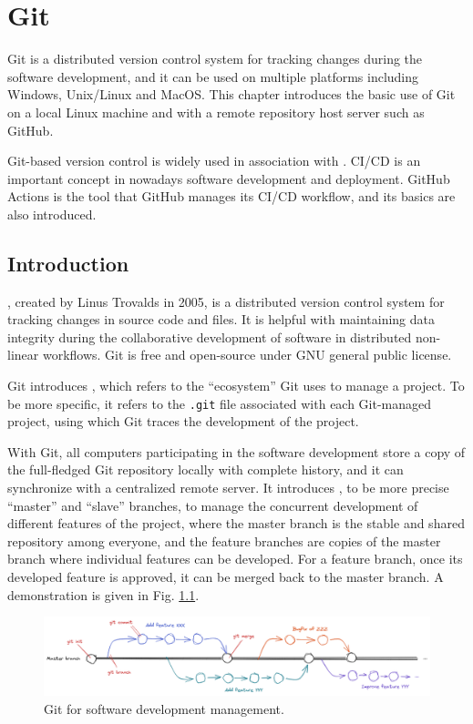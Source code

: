\chapter{Git} \label{ch:git}

Git is a distributed version control system for tracking changes during the software development, and it can be used on multiple platforms including Windows, Unix/Linux and MacOS. This chapter introduces the basic use of Git on a local Linux machine and with a remote repository host server such as GitHub. 

Git-based version control is widely used in association with . CI/CD is an important concept in nowadays software development and deployment. GitHub Actions is the tool that GitHub manages its CI/CD workflow, and its basics are also introduced.

\section{Introduction}

, created by Linus Trovalds in 2005, is a distributed version control system for tracking changes in source code and files. It is helpful with maintaining data integrity during the collaborative development of software in distributed non-linear workflows. Git is free and open-source under GNU general public license.

Git introduces , which refers to the ``ecosystem'' Git uses to manage a project. To be more specific, it refers to the \verb|.git| file associated with each Git-managed project, using which Git traces the development of the project. 

With Git, all computers participating in the software development store a copy of the full-fledged Git repository locally with complete history, and it can synchronize with a centralized remote server. It introduces , to be more precise ``master'' and ``slave'' branches, to manage the concurrent development of different features of the project, where the master branch is the stable and shared repository among everyone, and the feature branches are copies of the master branch where individual features can be developed. For a feature branch, once its developed feature is approved, it can be merged back to the master branch. A demonstration is given in Fig. \ref{ch:sma:fig:gitflow}.
\begin{figure}[htbp]
	\centering
	\includegraphics[width=350pt]{chapters/part-3/figures/gitflow.png}
	\caption{Git for software development management.} \label{ch:sma:fig:gitflow}
\end{figure}

